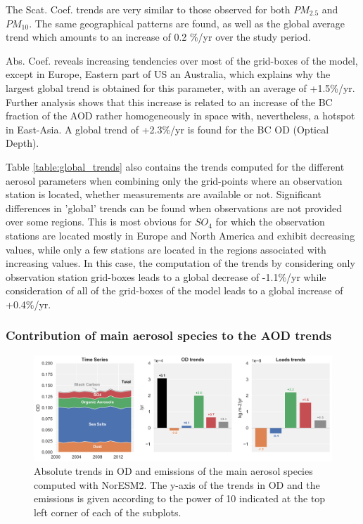 \documentclass[journal abbreviation, manuscript]{copernicus}
\begin{document}
The Scat. Coef. trends are very similar to those observed for both $PM_{2.5}$ and $PM_{10}$. The same geographical patterns are found, as well as the global average trend which amounts to an increase of 0.2 \%/yr over the study period.

Abs. Coef. reveals increasing tendencies over most of the grid-boxes of the model, except in Europe, Eastern part of US an Australia, which explains why the largest global trend is obtained for this parameter, with an average of +1.5\%/yr. Further analysis shows that this increase is related to an increase of the BC fraction of the AOD rather homogeneously in space with, nevertheless, a hotspot in East-Asia. A global trend of +2.3\%/yr is found for the BC OD (Optical Depth).

Table \ref{table:global_trends} also contains the trends computed for the different aerosol parameters when combining only the grid-points where an observation station is located, whether measurements are available or not. Significant differences in 'global' trends can be found when observations are not provided over some regions. This is most obvious for $SO_{4}$ for which the observation stations are located mostly in Europe and North America and exhibit decreasing values, while only a few stations are located in the regions associated with increasing values. In this case, the computation of the trends by considering only observation station grid-boxes leads to a global decrease of -1.1\%/yr while consideration of all of the grid-boxes of the model leads to a global increase of +0.4\%/yr.


\subsubsection{Contribution of main aerosol species to the AOD trends}

\begin{figure}[t]
 \includegraphics[width=16cm]{../scripts/figs/abs_species_trends.png}
 \caption{Absolute trends in OD and emissions of the main aerosol species computed with NorESM2. The y-axis of the trends in OD and the emissions is given according to the power of 10 indicated at the top left corner of each of the subplots.}
 \label{fig:species}
\end{figure}
\end{document}
